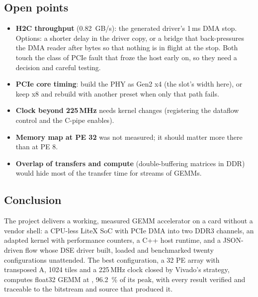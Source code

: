 \subsection{Open points}
\begin{itemize}
  \item \textbf{H2C throughput} (\SI{0.82}{GB/s}): the generated driver's 1\,ms DMA stop. Options: a shorter delay in
        the driver copy, or a bridge that back-pressures the DMA reader after  bytes so that nothing is in
        flight at the stop. Both touch the class of PCIe fault that froze the host early on, so they need a decision
        and careful testing.
  \item \textbf{PCIe core timing}: build the PHY as Gen2 x4 (the slot's width here), or keep x8 and rebuild with
        another preset when only that path fails.
  \item \textbf{Clock beyond 225\,MHz} needs kernel changes (registering the dataflow control and the C-pipe enables).
  \item \textbf{Memory map at PE 32} was not measured; it should matter more there than at PE 8.
  \item \textbf{Overlap of transfers and compute} (double-buffering matrices in DDR) would hide most of the transfer
        time for streams of GEMMs.
\end{itemize}

\subsection{Conclusion}
The project delivers a working, measured GEMM accelerator on a card without a vendor shell: a CPU-less LiteX SoC
with PCIe DMA into two DDR3 channels, an adapted  kernel with performance counters, a C++ host
runtime, and a JSON-driven flow whose DSE driver built, loaded and benchmarked twenty configurations unattended. The
best configuration, a 32 PE array with transposed A, 1024 tiles and a 225\,MHz clock closed by Vivado's
 strategy, computes float32 GEMM at \textbf{}, \SI{96.2}{\percent} of its peak, with
every result verified and traceable to the bitstream and source that produced it.

